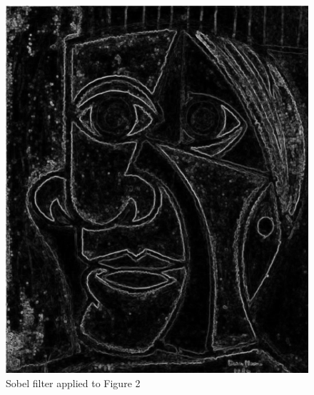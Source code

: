 \documentclass[12pt]{article}
\begin{document}
\begin{figure}[h]
\centering
\includegraphics[scale = 0.39]{img/picassoSobel}
\caption{Sobel filter applied to Figure 2}
\end{figure}
\newpage
\end{document}
